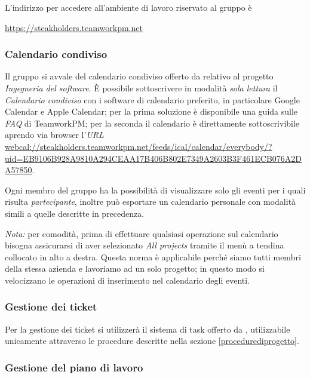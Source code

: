 		L'indirizzo per accedere all'ambiente di lavoro riservato al gruppo è
		\begin{center}
			\url{https://steakholders.teamworkpm.net}
		\end{center}
		
		\subsubsection{Calendario condiviso}
		\label{Calendario condiviso}
		
		Il gruppo si avvale del calendario condiviso offerto da  relativo al progetto \emph{Ingegneria del software}. È possibile sottoscrivere in modalità \emph{sola lettura} il \emph{Calendario condiviso} con i software di calendario preferito, in particolare Google Calendar e Apple Calendar; per la prima soluzione è disponibile una guida sulle \emph{FAQ} di TeamworkPM; per la seconda il calendario è direttamente sottoscrivibile aprendo via browser l'\emph{URL} \url{webcal://steakholders.teamworkpm.net/feeds/ical/calendar/everybody/?uid=EB9106B928A9810A294CEAA17B406B802E7349A2603B3F461ECB076A2DA57850}.
		
		Ogni membro del gruppo ha la possibilità di visualizzare solo gli eventi per i quali risulta \emph{partecipante}, inoltre può esportare un calendario personale con modalità simili a quelle descritte in precedenza.
		
		\textit{Nota:} per comodità, prima di effettuare qualsiasi operazione sul calendario bisogna assicurarsi di aver selezionato \emph{All projects} tramite il menù a tendina collocato in alto a destra. Questa norma è applicabile perché siamo tutti membri della stessa azienda e lavoriamo ad un solo progetto; in questo modo si velocizzano le operazioni di inserimento nel calendario degli eventi.
		
		\subsubsection{Gestione dei ticket}
		
		Per la gestione dei ticket si utilizzerà il sistema di task offerto da , utilizzabile unicamente attraverso le procedure descritte nella sezione \ref{procedurediprogetto}.
		
		\subsubsection{Gestione del piano di lavoro}
		
